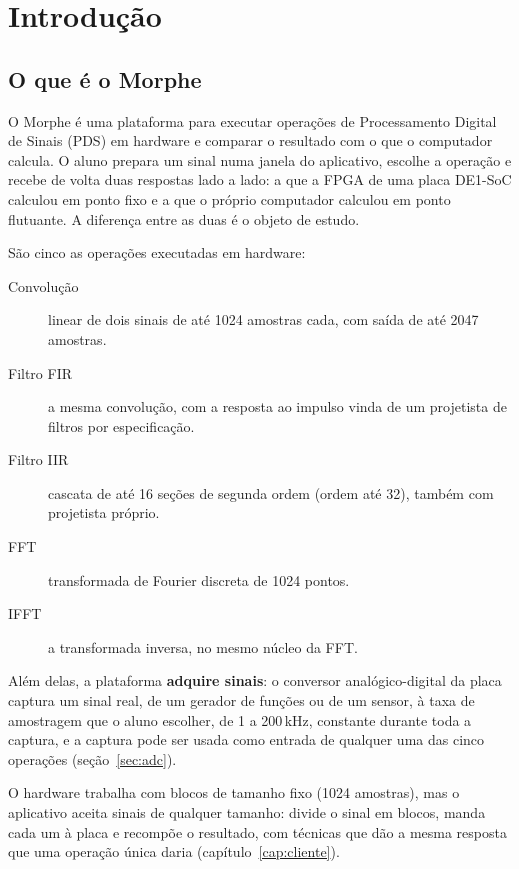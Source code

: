 \chapter{Introdução}
\label{cap:introducao}

\section{O que é o Morphe}

O Morphe é uma plataforma para executar operações de Processamento Digital de
Sinais (PDS) em hardware e comparar o resultado com o que o computador calcula.
O aluno prepara um sinal numa janela do aplicativo, escolhe a operação e recebe
de volta duas respostas lado a lado: a que a FPGA de uma placa DE1-SoC calculou
em ponto fixo e a que o próprio computador calculou em ponto flutuante. A
diferença entre as duas é o objeto de estudo.

São cinco as operações executadas em hardware:

\begin{description}
  \item[Convolução] linear de dois sinais de até 1024 amostras cada, com saída
    de até 2047 amostras.
  \item[Filtro FIR] a mesma convolução, com a resposta ao impulso vinda de um
    projetista de filtros por especificação.
  \item[Filtro IIR] cascata de até 16 seções de segunda ordem (ordem até 32),
    também com projetista próprio.
  \item[FFT] transformada de Fourier discreta de 1024 pontos.
  \item[IFFT] a transformada inversa, no mesmo núcleo da FFT.
\end{description}

Além delas, a plataforma \textbf{adquire sinais}: o conversor
analógico-digital da placa captura um sinal real, de um gerador de funções ou
de um sensor, à taxa de amostragem que o aluno escolher, de 1 a 200\,kHz,
constante durante toda a captura, e a captura pode
ser usada como entrada de qualquer uma das cinco operações
(seção~\ref{sec:adc}).

O hardware trabalha com blocos de tamanho fixo (1024 amostras), mas o
aplicativo aceita sinais de qualquer tamanho: divide o sinal em blocos, manda
cada um à placa e recompõe o resultado, com técnicas que dão a mesma resposta
que uma operação única daria (capítulo~\ref{cap:cliente}).

